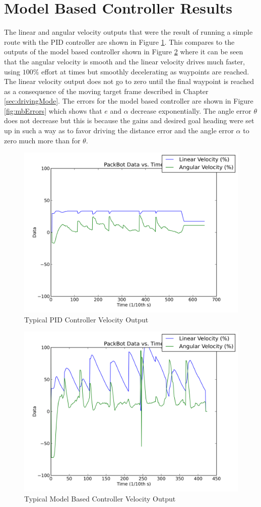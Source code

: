 \section{Model Based Controller Results}
\label{sec:lyapunovResults}
The linear and angular velocity outputs that were the result of running a simple route with the PID controller are shown in Figure \ref{fig:pidOutput}. This compares to the outputs of the model based controller shown in Figure \ref{fig:mbOutput} where it can be seen that the angular velocity is smooth and the linear velocity drives much faster, using $100\%$ effort at times but smoothly decelerating as waypoints are reached. The linear velocity output does not go to zero until the final waypoint is reached as a consequence of the moving target frame described in Chapter \ref{sec:drivingMode}. The errors for the model based controller are shown in Figure \ref{fig:mbErrors} which shows that $e$ and $\alpha$ decrease exponentially. The angle error $\theta$ does not decrease but this is because the gains and desired goal heading were set up in such a way as to favor driving the distance error and the angle error $\alpha$ to zero much more than for $\theta$.

\begin{figure}[ht!]
	\centering
	\includegraphics[width=.5\textwidth]{images/pbtx/20110109_1815_pbtx_simpleDrivePID}
	\caption{Typical PID Controller Velocity Output}
	\label{fig:pidOutput}
\end{figure}

\begin{figure}[ht!]
	\centering
	\includegraphics[width=.5\textwidth]{images/pbtx/20110109_1837_pbtx_simpleDrive}
	\caption{Typical Model Based Controller Velocity Output}
	\label{fig:mbOutput}
\end{figure}

